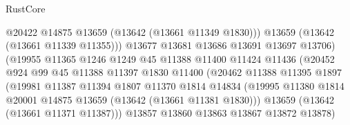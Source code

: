 \begin{lexlean}{RustCore}
\begin{coremodule}
                                        @20422
                                        @14875
                                        @13659
                                        (@13642 (@13661 @11349 @1830)))
                                      @13659
                                      (@13642 (@13661 @11339 @11355)))
                                    @13677
                                    @13681
                                    @13686
                                    @13691
                                    @13697
                                    @13706)
                                  (@19955
                                    @11365
                                    @1246
                                    @1249
                                    @45
                                    @11388
                                    @11400
                                    @11424
                                    @11436
                                    (@20452
                                      @924
                                      @99
                                      @45
                                      @11388
                                      @11397
                                      @1830
                                      @11400
                                      (@20462
                                        @11388
                                        @11395
                                        @1897
                                        (@19981
                                          @11387
                                          @11394
                                          @1807
                                          @11370
                                          @1814
                                          @14834
                                          (@19995
                                            @11380
                                            @1814
                                            @20001
                                            @14875
                                            @13659
                                            (@13642 (@13661 @11381 @1830)))
                                          @13659
                                          (@13642 (@13661 @11371 @11387)))
                                        @13857
                                        @13860
                                        @13863
                                        @13867
                                        @13872
                                        @13878)

\end{coremodule}
\end{lexlean}
